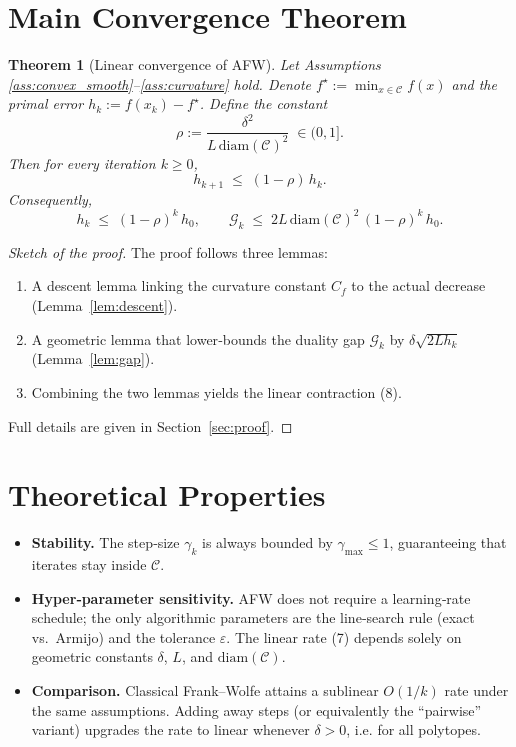 \documentclass{article}
\newtheorem{theorem}{Theorem}
\newcommand{\C}{\mathcal{C}}
\newcommand{\gap}{\mathcal{G}}
\newcommand{\diam}{\mathrm{diam}}
\newcommand{\curv}{C_f}
\begin{document}
\section*{Main Convergence Theorem}
\begin{theorem}[Linear convergence of AFW]\label{thm:linear}
Let Assumptions \ref{ass:convex_smooth}–\ref{ass:curvature} hold.
Denote $f^\star:=\min_{x\in\C}f(x)$ and the primal error $h_k:=f(x_k)-f^\star$.
Define the constant
\[
\rho:=\frac{\delta^{2}}{L\,\diam(\C)^{2}}\;\in(0,1].
\tag{7}
\]
Then for every iteration $k\ge0$,
\[
h_{k+1}\;\le\;(1-\rho)\,h_{k}.
\tag{8}
\]
Consequently,
\[
h_{k}\;\le\;(1-\rho)^{k}\,h_{0},
\qquad
\gap_k\;\le\;2L\,\diam(\C)^{2}\,(1-\rho)^{k}\,h_{0}.
\tag{9}
\]
\end{theorem}
\begin{proof}[Sketch of the proof]
The proof follows three lemmas:
\begin{enumerate}[label={\bf Lemma \arabic*}:, leftmargin=*]
\item A descent lemma linking the curvature constant $\curv$ to the actual decrease (Lemma~\ref{lem:descent}).
\item A geometric lemma that lower‑bounds the duality gap $\gap_k$ by $\delta\sqrt{2Lh_k}$ (Lemma~\ref{lem:gap}).
\item Combining the two lemmas yields the linear contraction (8).
\end{enumerate}
Full details are given in Section~\ref{sec:proof}.
\end{proof}

\section*{Theoretical Properties}
\begin{itemize}
\item \textbf{Stability.} The step‑size $\gamma_k$ is always bounded by $\gamma_{\max}\le1$, guaranteeing that iterates stay inside $\C$.
\item \textbf{Hyper‑parameter sensitivity.} AFW does not require a learning‑rate schedule; the only algorithmic parameters are the line‑search rule (exact vs.~Armijo) and the tolerance $\varepsilon$. The linear rate (7) depends solely on geometric constants $\delta$, $L$, and $\diam(\C)$.
\item \textbf{Comparison.} Classical Frank–Wolfe attains a sublinear $O(1/k)$ rate under the same assumptions. Adding away steps (or equivalently the ``pairwise'' variant) upgrades the rate to linear whenever $\delta>0$, i.e. for all polytopes.
\end{itemize}
\end{document}
